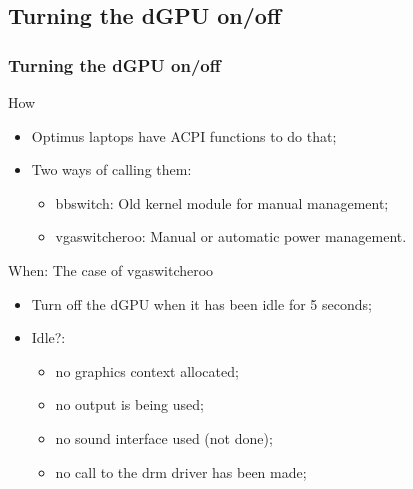 \documentclass[11pt,english,compress]{beamer}
\begin{document}
\subsection{Turning the dGPU on/off}
\begin{frame}
	\frametitle{Turning the dGPU on/off}

	\begin{block}{How}
		\begin{itemize}
			\item Optimus laptops have ACPI functions to do that;
			\item Two ways of calling them:
			\begin{itemize}
				\item bbswitch: Old kernel module for manual management;
				\item vgaswitcheroo: Manual or automatic power management.
			\end{itemize}
		\end{itemize}
	\end{block}

	\begin{block}{When: The case of vgaswitcheroo}
		\begin{itemize}
			\item Turn off the dGPU when it has been idle for 5 seconds;
			\item Idle?: 
			\begin{itemize}
				\item no graphics context allocated;
				\item no output is being used;
				\item no sound interface used (not done);
				\item no call to the drm driver has been made;
			\end{itemize}
		\end{itemize}
	\end{block}
\end{frame}
\end{document}
